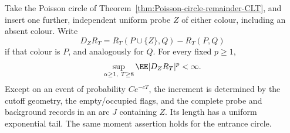 \documentclass[11pt,letterpaper]{article}
\begin{document}
\begin{lemma}
\label{lem:local-remainder-increment}
Take the Poisson circle of Theorem~\ref{thm:Poisson-circle-remainder-CLT},
and insert one further, independent uniform probe $Z$ of either colour, including an absent colour. Write
\[
 D_ZR_T=R_T(P\cup\{Z\},Q)-R_T(P,Q)
\]
if that colour is $P$, and analogously for $Q$.
For every fixed $p\ge1$,
\begin{equation}\label{eq:local-remainder-increment}
 \sup_{\alpha\ge1,\ T\ge8}\EE|D_ZR_T|^p<\infty.
\end{equation}
Except on an event of probability $Ce^{-cT}$, the increment is
determined by the cutoff geometry, the empty/occupied flags,
and the complete probe and background records in an arc $J$
containing $Z$. Its length has a uniform exponential tail.
The same moment assertion holds for the entrance circle.
\end{lemma}
\end{document}
